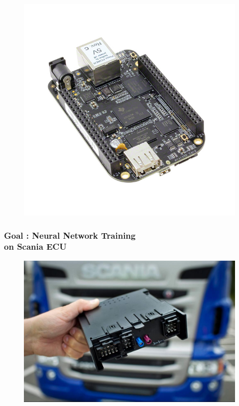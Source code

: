 \documentclass{beamer}
\begin{document}
\begin{frame}
\begin{figure}
    \includegraphics[scale=0.175]{../Body/images/bbb}
  \end{figure}

\end{frame}

\begin{frame}
  \frametitle{Goal : Neural Network Training \\ on Scania ECU}

  \begin{figure}
    \centering
    \includegraphics[scale=0.21]{../Body/images/c300.jpeg}
  \end{figure}

\end{frame}
\end{document}
